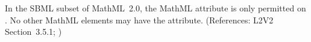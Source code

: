 In the SBML subset of MathML~2.0, the MathML attribute
 is only permitted on .  No other
MathML elements may have the  attribute.
(References: L2V2 Section~3.5.1; )
